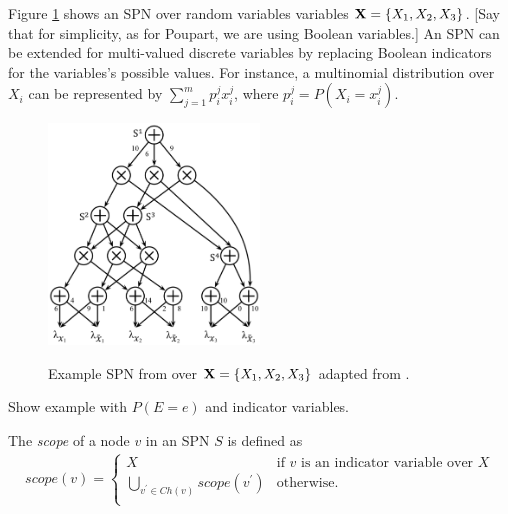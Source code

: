 %
%

Figure \ref{fig:spn} shows an SPN over random variables variables ${\bf X}=\{X_1,X_2,X_3\}$.
[Say that for simplicity, as for Poupart, we are using Boolean variables.]
An SPN can be extended for multi-valued discrete variables by replacing Boolean indicators for the variables's possible values.
For instance, a multinomial distribution over $X_i$ can be represented by $\sum_{j=1}^{m}{p^j_i x^j_i}$, where $p^j_i = P(X_i = x^j_i)$.


\begin{figure}[h]
    \begin{center}
		\includegraphics[width=0.5\textwidth]{figures/SPN.png}
		\caption{Example SPN from over ${\bf X}=\{X_1,X_2,X_3\}$ adapted from \cite{Peharz:2016wl}.}
		\label{fig:spn}
    \label{fig:spn}
    \end{center}
\end{figure}

\begin{example}
Show example with $P(E=e)$ and indicator variables.	
\end{example}

The \emph{scope} of a node $v$ in an SPN $S$ is defined as
\begin{align*}
scope(v) = \begin{cases}
				X & \text{if $v$ is an indicator variable over $X$}\\
				\bigcup_{v^\prime \in Ch(v)}{scope(v^\prime)} &\text{otherwise.}\\
			\end{cases}
\end{align*}

